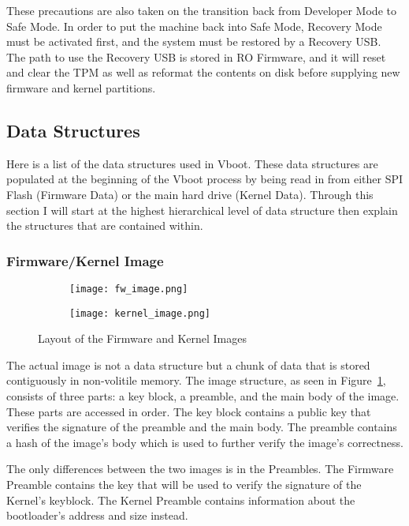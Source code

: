 \documentclass[../report.tex]{subfiles}
\begin{document}
These precautions are also taken on the transition back from Developer Mode to Safe Mode. 
In order to put the machine back into Safe Mode, Recovery Mode must be activated first, and the system must be restored by a Recovery USB\@.
The path to use the Recovery USB is stored in RO Firmware, and it will reset and clear the TPM as well as reformat the contents on disk before supplying new firmware and kernel partitions. 

\subsection{Data Structures}

Here is a list of the data structures used in Vboot.
These data structures are populated at the beginning of the Vboot process by being read in from either SPI Flash (Firmware Data) or the main hard drive (Kernel Data).
Through this section I will start at the highest hierarchical level of data structure then explain the structures that are contained within.

\subsubsection{Firmware/Kernel Image}

\begin{figure}
\begin{subfigure}{.5\textwidth}
  \centering
  \texttt{[image: fw\_image.png]}
\end{subfigure}%
\begin{subfigure}{.5\textwidth}
  \centering
  \texttt{[image: kernel\_image.png]}
\end{subfigure}
\caption{Layout of the Firmware and Kernel Images}
\label{fig:vboot_images}
\end{figure}

The actual image is not a data structure but a chunk of data that is stored contiguously in non-volitile memory.
The image structure, as seen in Figure~\ref{fig:vboot_images}, consists of three parts: a key block, a preamble, and the main body of the image.
These parts are accessed in order.
The key block contains a public key that verifies the signature of the preamble and the main body. 
The preamble contains a hash of the image's body which is used to further verify the image's correctness.

The only differences between the two images is in the Preambles.
The Firmware Preamble contains the key that will be used to verify the signature of the Kernel's keyblock.
The Kernel Preamble contains information about the bootloader's address and size instead.
\end{document}
